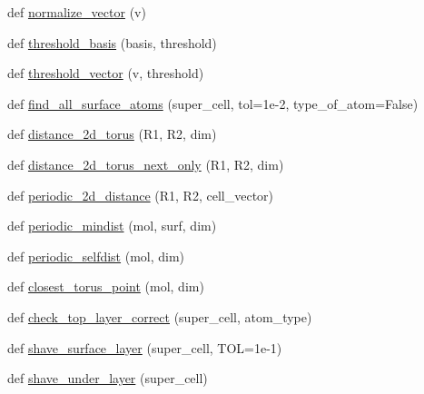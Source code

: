 \begin{DoxyCompactItemize}
\item 
def \hyperlink{namespacemolSimplify_1_1Scripts_1_1cellbuilder__tools_acc8a403378889582969b9c7f3ca7500e}{normalize\+\_\+vector} (v)
\item 
def \hyperlink{namespacemolSimplify_1_1Scripts_1_1cellbuilder__tools_a2fcf4ae7cb93845bad8e004ca7453c91}{threshold\+\_\+basis} (basis, threshold)
\item 
def \hyperlink{namespacemolSimplify_1_1Scripts_1_1cellbuilder__tools_a9dc8102730a26e44c0000e26083b03fa}{threshold\+\_\+vector} (v, threshold)
\item 
def \hyperlink{namespacemolSimplify_1_1Scripts_1_1cellbuilder__tools_a79ad9949a6d1245131a2100397dc1c5e}{find\+\_\+all\+\_\+surface\+\_\+atoms} (super\+\_\+cell, tol=1e-\/2, type\+\_\+of\+\_\+atom=\+False)
\item 
def \hyperlink{namespacemolSimplify_1_1Scripts_1_1cellbuilder__tools_afbb5e3a574b01b5453cde7480935274a}{distance\+\_\+2d\+\_\+torus} (R1, R2, dim)
\item 
def \hyperlink{namespacemolSimplify_1_1Scripts_1_1cellbuilder__tools_ad2d18e2318556932990c9262691c1d91}{distance\+\_\+2d\+\_\+torus\+\_\+next\+\_\+only} (R1, R2, dim)
\item 
def \hyperlink{namespacemolSimplify_1_1Scripts_1_1cellbuilder__tools_a862c53597bbd8f918f5a77cf5438aac8}{periodic\+\_\+2d\+\_\+distance} (R1, R2, cell\+\_\+vector)
\item 
def \hyperlink{namespacemolSimplify_1_1Scripts_1_1cellbuilder__tools_a2adb772a7c2390ca7c3b0e5dea3fc783}{periodic\+\_\+mindist} (mol, surf, dim)
\item 
def \hyperlink{namespacemolSimplify_1_1Scripts_1_1cellbuilder__tools_acb746c95cfe67c96ae6373e417eab2e7}{periodic\+\_\+selfdist} (mol, dim)
\item 
def \hyperlink{namespacemolSimplify_1_1Scripts_1_1cellbuilder__tools_af8a1ed30f049db9b5e62efebf140ad97}{closest\+\_\+torus\+\_\+point} (mol, dim)
\item 
def \hyperlink{namespacemolSimplify_1_1Scripts_1_1cellbuilder__tools_a4e3c16c18b531561b257151f49a3f80f}{check\+\_\+top\+\_\+layer\+\_\+correct} (super\+\_\+cell, atom\+\_\+type)
\item 
def \hyperlink{namespacemolSimplify_1_1Scripts_1_1cellbuilder__tools_a66b86c0494d33f0dbb9f3a2d07d390d0}{shave\+\_\+surface\+\_\+layer} (super\+\_\+cell, T\+OL=1e-\/1)
\item 
def \hyperlink{namespacemolSimplify_1_1Scripts_1_1cellbuilder__tools_a0ac17a93be39924d06ddc4776f9409ce}{shave\+\_\+under\+\_\+layer} (super\+\_\+cell)

\end{DoxyCompactItemize}
